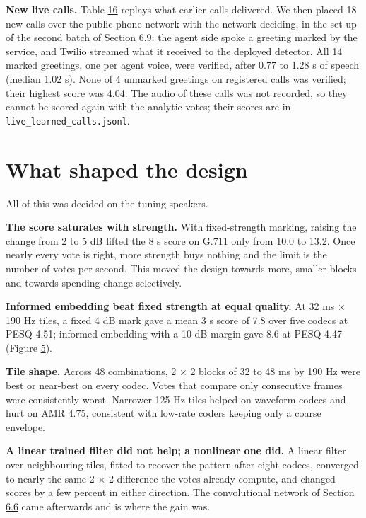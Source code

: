 \documentclass[10pt,a4paper]{article}
\begin{document}
\textbf{New live calls.} Table \hyperref[t-16]{16} replays what earlier calls delivered. We then placed 18 new calls over the public phone network with the network deciding, in the set-up of the second batch of Section \hyperref[s-6-9]{6.9}: the agent side spoke a greeting marked by the service, and Twilio streamed what it received to the deployed detector. All 14 marked greetings, one per agent voice, were verified, after 0.77 to 1.28 s of speech (median 1.02 s). None of 4 unmarked greetings on registered calls was verified; their highest score was 4.04. The audio of these calls was not recorded, so they cannot be scored again with the analytic votes; their scores are in \texttt{live\_learned\_calls.jsonl}.

\section{What shaped the design}\label{s-7}

All of this was decided on the tuning speakers.

\textbf{The score saturates with strength.} With fixed-strength marking, raising the change from 2 to 5 dB lifted the 8 s score on G.711 only from 10.0 to 13.2. Once nearly every vote is right, more strength buys nothing and the limit is the number of votes per second. This moved the design towards more, smaller blocks and towards spending change selectively.

\textbf{Informed embedding beat fixed strength at equal quality.} At 32 ms $\times$ 190 Hz tiles, a fixed 4 dB mark gave a mean 3 s score of 7.8 over five codecs at PESQ 4.51; informed embedding with a 10 dB margin gave 8.6 at PESQ 4.47 (Figure \hyperref[f-5]{5}).

\textbf{Tile shape.} Across 48 combinations, 2 $\times$ 2 blocks of 32 to 48 ms by 190 Hz were best or near-best on every codec. Votes that compare only consecutive frames were consistently worst. Narrower 125 Hz tiles helped on waveform codecs and hurt on AMR 4.75, consistent with low-rate coders keeping only a coarse envelope.

\textbf{A linear trained filter did not help; a nonlinear one did.} A linear filter over neighbouring tiles, fitted to recover the pattern after eight codecs, converged to nearly the same 2 $\times$ 2 difference the votes already compute, and changed scores by a few percent in either direction. The convolutional network of Section \hyperref[s-6-6]{6.6} came afterwards and is where the gain was.
\end{document}
